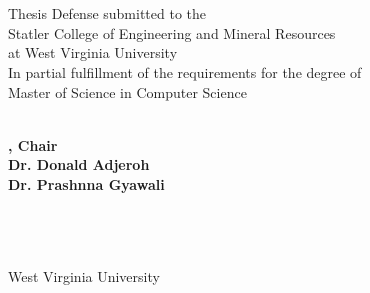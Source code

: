 \documentclass[
12pt, %
oneside, %
english, %
singlespacing, %
liststotoc, %
headsepline, %
chapterinoneline, %
]{MastersDoctoralThesis} %
\author{Ram Jitendrabhai Zaveri} %
\begin{document}
\frontmatter %

\pagestyle{plain} %


\begin{titlepage}
\begin{center}

\vspace*{.04\textheight}

{\huge \bfseries \ttitle\par}\vspace{0.4cm} %
\leavevmode\\[0.5cm]
\textbf{\Large{\authorname}} %
\leavevmode\\[1cm]
{\large Thesis Defense submitted to the \\
Statler College of Engineering and Mineral Resources
\\at West Virginia University\\[0.3cm]
In partial fulfillment of the requirements for the degree of \\
Master of Science in Computer Science}  %
\leavevmode\\[0.3cm]
\begin{center} \large
\emph{} \\
\textbf{{\supname}, Chair %
\\Dr. Donald Adjeroh
\\Dr. Prashnna Gyawali}
\end{center}
\leavevmode\\[1cm]
\textsc{\Large \deptname}\leavevmode\\[0.7cm]
{\LARGE \leavevmode\\West Virginia University}\leavevmode\\ [0.2cm]


\end{center}
\end{titlepage}
\end{document}
